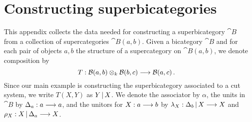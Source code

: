\documentclass[english,letter paper,12pt,leqno]{article}
\theoremstyle{example}
\numberwithin{equation}{section}
\begin{document}
\section{Constructing superbicategories}\label{section:constructing_superbicategories}

This appendix collects the data needed for constructing a superbicategory $\cat{B}$ from a collection of supercategories $\cat{B}(a,b)$. Given a bicategory $\cat{B}$ and for each pair of objects $a,b$ the structure of a supercategory on $\cat{B}(a,b)$, we denote composition by
\[
T: \mathcal{B}(a, b) \otimes_k \mathcal{B}(b,c) \longrightarrow \mathcal{B}(a,c)\,.
\]
Since our main example is constructing the superbicategory associated to a cut system, we write $T(X,Y)$ as $Y \,|\, X$. We denote the associator by $\alpha$, the units in $\cat{B}$ by $\Delta_a: a \longrightarrow a$, and the unitors for $X: a \longrightarrow b$ by $\lambda_X: \Delta_b \,|\, X \longrightarrow X$ and $\rho_X: X \,|\, \Delta_a \longrightarrow X$.
\end{document}
